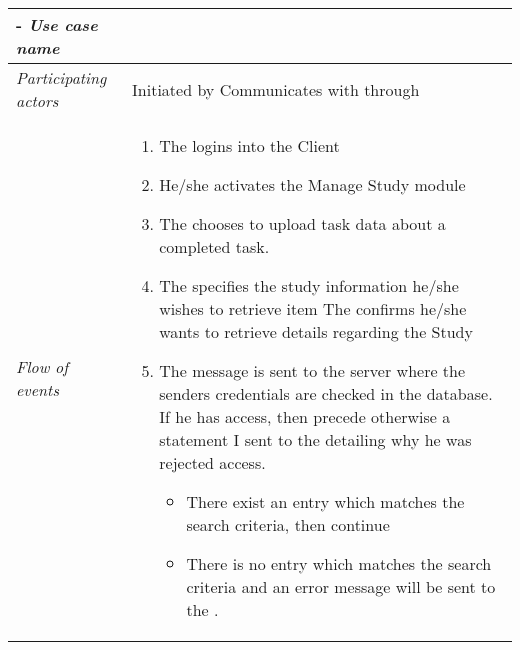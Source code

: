 
%



%
%
\begin{table}[H]
\tabulinesep=1.5mm
\begin{tabu} to 
	\tabucline[1.5pt]-
	\textit{Use case name} & \RetrieveStudyInformation \\
	\hline
	\textit{Participating actors} & Initiated by \client \newline Communicates with \server through \client \\
	\hline
	\textit{Flow of events} &
	\vspace{-3mm}
	\begin{enumerate}[leftmargin=*,topsep=0pt,itemsep=-1ex]
		\item The \client logins into the Client
		\item He/she activates the Manage Study module
		\item The \client chooses to upload task data about a completed task.
		\item The \client specifies the study information he/she wishes to retrieve
		item The \client confirms he/she wants to retrieve details regarding the Study
		\item The message is sent to the server where the senders credentials are checked in the database. If he has access, then precede otherwise a statement I sent to the \client detailing why he was rejected access.
		\begin{itemize} 
			\item There exist an entry which matches the search criteria, then continue 
			\item There is no entry which matches the search criteria and an error message will be sent to the \client.
		\end{itemize}
				

\end{enumerate}
\end{tabu}
\end{table}
